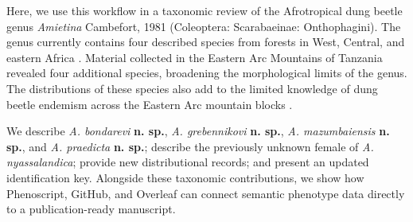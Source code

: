 Here, we use this workflow in a taxonomic review of the Afrotropical dung beetle genus \textit{Amietina} Cambefort, 1981 (Coleoptera: Scarabaeinae: Onthophagini). The genus currently contains four described species from forests in West, Central, and eastern Africa \citep{cambefort1981amietina, branco1989deux}. Material collected in the Eastern Arc Mountains of Tanzania revealed four additional species, broadening the morphological limits of the genus. The distributions of these species also add to the limited knowledge of dung beetle endemism across the Eastern Arc mountain blocks \citep{burgess2007biological, montanaro2024microallopatric}.

We describe \textit{A. bondarevi} \textbf{n. sp.}, \textit{A. grebennikovi} \textbf{n. sp.}, \textit{A. mazumbaiensis} \textbf{n. sp.}, and \textit{A. praedicta} \textbf{n. sp.}; describe the previously unknown female of \textit{A. nyassalandica}; provide new distributional records; and present an updated identification key. Alongside these taxonomic contributions, we show how Phenoscript, GitHub, and Overleaf can connect semantic phenotype data directly to a publication-ready manuscript.
